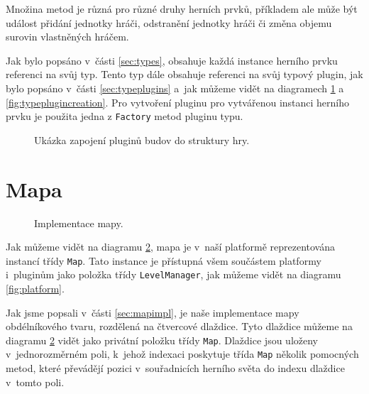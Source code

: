 Množina metod je různá pro různé druhy herních prvků, příkladem ale může být událost přidání jednotky hráči, odstranění jednotky hráči či změna objemu surovin vlastněných hráčem.

Jak bylo popsáno v~části \ref{sec:types}, obsahuje každá instance herního prvku referenci na svůj typ. Tento typ dále obsahuje referenci na svůj typový plugin, jak bylo popsáno v~části \ref{sec:typeplugins} a~jak můžeme vidět na diagramech \ref{fig:pluginstructure} a \ref{fig:typeplugincreation}. Pro vytvoření pluginu pro vytvářenou instanci herního prvku je použita jedna z \texttt{Factory} metod pluginu typu. 

\begin{figure}[h]
	\centering
	\fontsize{8pt}{11pt}\selectfont
	\def\svgwidth{\textwidth}
	
	\caption{Ukázka zapojení pluginů budov do struktury hry.}
	\label{fig:pluginstructure}
\end{figure}

\section{Mapa}
\label{sec:mapimpldoc}

\begin{figure}[h]
	\centering
	\fontsize{8pt}{11pt}\selectfont
	\def\svgwidth{\textwidth}
	
	\caption{Implementace mapy.}
	\label{fig:mapimpl}
\end{figure}

Jak můžeme vidět na diagramu \ref{fig:mapimpl}, mapa je v~naší platformě reprezentována instancí třídy \texttt{Map}. Tato instance je přístupná všem součástem platformy i~pluginům jako položka třídy \texttt{LevelManager}, jak můžeme vidět na diagramu \ref{fig:platform}. 

Jak jsme popsali v~části \ref{sec:mapimpl}, je naše implementace mapy obdélníkového tvaru, rozdělená na čtvercové dlaždice. Tyto dlaždice můžeme na diagramu \ref{fig:mapimpl} vidět jako privátní položku třídy \texttt{Map}. Dlaždice jsou uloženy v~jednorozměrném poli, k~jehož indexaci poskytuje třída \texttt{Map} několik pomocných metod, které převádějí pozici v~souřadnicích herního světa do indexu dlaždice v~tomto poli. 

